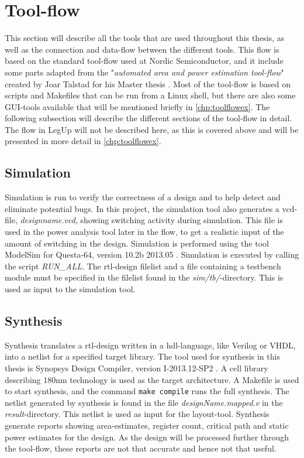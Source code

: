 \section{\label{sec:toolflowbg}Tool-flow}
This section will describe all the tools that are used throughout this thesis, as well as the connection and data-flow between the different tools. This flow is based on the standard tool-flow used at Nordic Semiconductor, and it include some parts adapted from the "\textit{automated area and power estimation tool-flow}" created by Joar Talstad for his Master thesis \cite{talstad15master}. Most of the tool-flow is based on scripts and Makefiles that can be run from a Linux shell, but there are also some GUI-tools available that will be mentioned briefly in \cref{chp:toolflowex}. The following subsection will describe the different sections of the tool-flow in detail. The flow in LegUp will not be described here, as this is covered above and will be presented in more detail in \cref{chp:toolflowex}.

\subsection{Simulation}
Simulation is run to verify the correctness of a design and to help detect and eliminate potential bugs. In this project, the simulation tool also generates a \gls{vcd}-file, \textit{designname.vcd}, showing switching activity during simulation. This file is used in the power analysis tool later in the flow, to get a realistic input of the amount of switching in the design. Simulation is performed using the tool ModelSim for Questa-64, version 10.2b 2013.05 \cite{questasim}. Simulation is executed by calling the script \textit{RUN\_ALL}. The \gls{rtl}-design filelist and a file containing a testbench module must be specified in the filelist found in the \textit{sim/tb/}-directory. This is used as input to the simulation tool.
\subsection{Synthesis}
Synthesis translates a \gls{rtl}-design written in a \gls{hdl}-language, like Verilog or VHDL, into a netlist for a specified target library. The tool used for synthesis in this thesis is Synopsys Design Compiler, version I-2013.12-SP2 \cite{syndescomp}. A cell library describing 180nm technology is used as the target architecture. A Makefile is used to start synthesis, and the command \verb!make compile! runs the full synthesis. The netlist generated by synthesis is found in the file \textit{designName.mapped.v} in the \textit{result}-directory. This netlist is used as input for the layout-tool. Synthesis generate reports showing area-estimates, register count, critical path and static power estimates for the design. As the design will be processed further through the tool-flow, these reports are not that accurate and hence not that useful.
